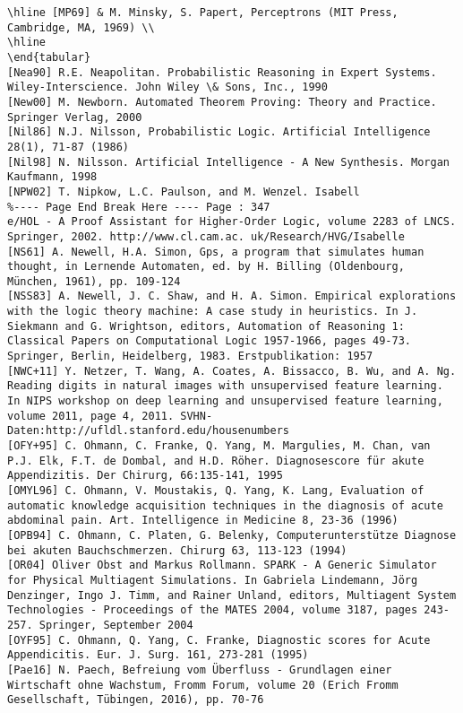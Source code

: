 \documentclass[10pt]{article}
\begin{document}
\begin{verbatim}
\hline [MP69] & M. Minsky, S. Papert, Perceptrons (MIT Press, Cambridge, MA, 1969) \\
\hline
\end{tabular}
[Nea90] R.E. Neapolitan. Probabilistic Reasoning in Expert Systems. Wiley-Interscience. John Wiley \& Sons, Inc., 1990
[New00] M. Newborn. Automated Theorem Proving: Theory and Practice. Springer Verlag, 2000
[Nil86] N.J. Nilsson, Probabilistic Logic. Artificial Intelligence 28(1), 71-87 (1986)
[Nil98] N. Nilsson. Artificial Intelligence - A New Synthesis. Morgan Kaufmann, 1998
[NPW02] T. Nipkow, L.C. Paulson, and M. Wenzel. Isabell
%---- Page End Break Here ---- Page : 347
e/HOL - A Proof Assistant for Higher-Order Logic, volume 2283 of LNCS. Springer, 2002. http://www.cl.cam.ac. uk/Research/HVG/Isabelle
[NS61] A. Newell, H.A. Simon, Gps, a program that simulates human thought, in Lernende Automaten, ed. by H. Billing (Oldenbourg, München, 1961), pp. 109-124
[NSS83] A. Newell, J. C. Shaw, and H. A. Simon. Empirical explorations with the logic theory machine: A case study in heuristics. In J. Siekmann and G. Wrightson, editors, Automation of Reasoning 1: Classical Papers on Computational Logic 1957-1966, pages 49-73. Springer, Berlin, Heidelberg, 1983. Erstpublikation: 1957
[NWC+11] Y. Netzer, T. Wang, A. Coates, A. Bissacco, B. Wu, and A. Ng. Reading digits in natural images with unsupervised feature learning. In NIPS workshop on deep learning and unsupervised feature learning, volume 2011, page 4, 2011. SVHN-Daten:http://ufldl.stanford.edu/housenumbers
[OFY+95] C. Ohmann, C. Franke, Q. Yang, M. Margulies, M. Chan, van P.J. Elk, F.T. de Dombal, and H.D. Röher. Diagnosescore für akute Appendizitis. Der Chirurg, 66:135-141, 1995
[OMYL96] C. Ohmann, V. Moustakis, Q. Yang, K. Lang, Evaluation of automatic knowledge acquisition techniques in the diagnosis of acute abdominal pain. Art. Intelligence in Medicine 8, 23-36 (1996)
[OPB94] C. Ohmann, C. Platen, G. Belenky, Computerunterstütze Diagnose bei akuten Bauchschmerzen. Chirurg 63, 113-123 (1994)
[OR04] Oliver Obst and Markus Rollmann. SPARK - A Generic Simulator for Physical Multiagent Simulations. In Gabriela Lindemann, Jörg Denzinger, Ingo J. Timm, and Rainer Unland, editors, Multiagent System Technologies - Proceedings of the MATES 2004, volume 3187, pages 243-257. Springer, September 2004
[OYF95] C. Ohmann, Q. Yang, C. Franke, Diagnostic scores for Acute Appendicitis. Eur. J. Surg. 161, 273-281 (1995)
[Pae16] N. Paech, Befreiung vom Überfluss - Grundlagen einer Wirtschaft ohne Wachstum, Fromm Forum, volume 20 (Erich Fromm Gesellschaft, Tübingen, 2016), pp. 70-76

\end{verbatim}
\end{document}
